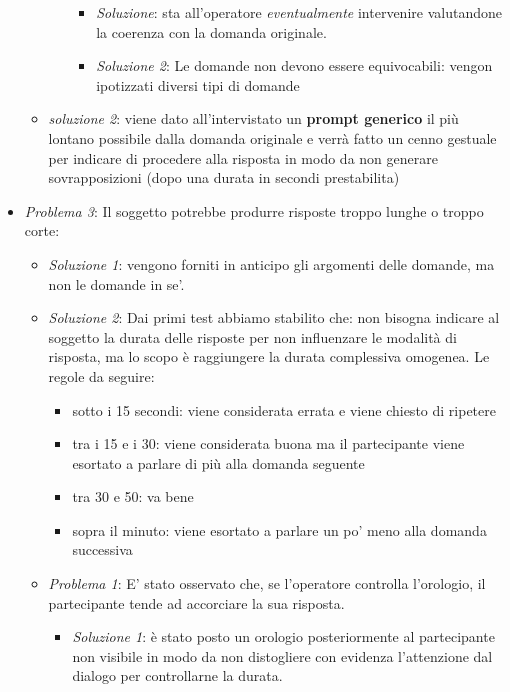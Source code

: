 \documentclass[
]{article}
\providecommand{\tightlist}{%
  \setlength{\itemsep}{0pt}\setlength{\parskip}{0pt}}
\begin{document}
\begin{itemize}
\begin{itemize}
\begin{itemize}
      \begin{itemize}
      \tightlist
      \item
        \emph{Soluzione}: sta all'operatore \emph{eventualmente} intervenire valutandone la coerenza con la domanda originale.
      \item
        \emph{Soluzione 2}: Le domande non devono essere equivocabili: vengon ipotizzati diversi tipi di domande
      \end{itemize}
    \end{itemize}
  \item
    \emph{soluzione 2}: viene dato all'intervistato un \textbf{prompt generico} il più lontano possibile dalla domanda originale e verrà fatto un cenno gestuale per indicare di procedere alla risposta in modo da non generare sovrapposizioni (dopo una durata in secondi prestabilita)
  \end{itemize}
\item
  \emph{Problema 3}: Il soggetto potrebbe produrre risposte troppo lunghe o troppo corte:

  \begin{itemize}
  \tightlist
  \item
    \emph{Soluzione 1}: vengono forniti in anticipo gli argomenti delle domande, ma non le domande in se'.
  \item
    \emph{Soluzione 2}: Dai primi test abbiamo stabilito che: non bisogna indicare al soggetto la durata delle risposte per non influenzare le modalità di risposta, ma lo scopo è raggiungere la durata complessiva omogenea. Le regole da seguire:

    \begin{itemize}
    \tightlist
    \item
      sotto i 15 secondi: viene considerata errata e viene chiesto di ripetere
    \item
      tra i 15 e i 30: viene considerata buona ma il partecipante viene esortato a parlare di più alla domanda seguente
    \item
      tra 30 e 50: va bene
    \item
      sopra il minuto: viene esortato a parlare un po' meno alla domanda successiva
    \end{itemize}
  \item
    \emph{Problema 1}: E' stato osservato che, se l'operatore controlla l'orologio, il partecipante tende ad accorciare la sua risposta.

    \begin{itemize}
    \tightlist
    \item
      \emph{Soluzione 1}: è stato posto un orologio posteriormente al partecipante non visibile in modo da non distogliere con evidenza l'attenzione dal dialogo per controllarne la durata.
    \end{itemize}
  \end{itemize}
\end{itemize}
\end{document}
